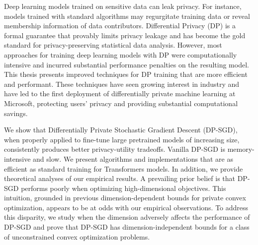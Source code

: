 
Deep learning models trained on sensitive data can leak privacy.
For instance, models trained with standard algorithms may regurgitate training data or reveal membership information of data contributors.
Differential Privacy (DP) is a formal guarantee that provably limits privacy leakage and has become the gold standard for privacy-preserving statistical data analysis.
However, most approaches for training deep learning models with DP were computationally intensive and incurred substantial performance penalties on the resulting model.
This thesis presents improved techniques for DP training that are more efficient and performant.
These techniques have seen growing interest in industry and have led to the first deployment of differentially private machine learning at Microsoft, protecting users' privacy and providing substantial computational savings.

We show that Differentially Private Stochastic Gradient Descent (DP-SGD), when properly applied to fine-tune large pretrained models of increasing size, consistently produces better privacy-utility tradeoffs. Vanilla DP-SGD is memory-intensive and slow. We present algorithms and implementations that are as efficient as standard training for Transformers models.
In addition, we provide theoretical analyses of our empirical results.
A prevailing prior belief is that DP-SGD performs poorly when optimizing high-dimensional objectives. 
This intuition, grounded in previous dimension-dependent bounds for private convex optimization, appears to be at odds with our empirical observations. 
To address this disparity, we study when the dimension adversely affects the performance of DP-SGD and prove that DP-SGD has dimension-independent bounds for a class of unconstrained convex optimization problems. 
